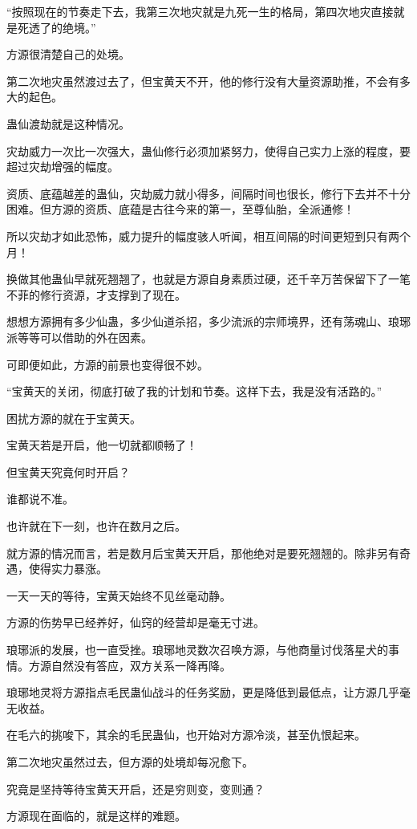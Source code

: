 \begin{this_body}
“按照现在的节奏走下去，我第三次地灾就是九死一生的格局，第四次地灾直接就是死透了的绝境。”

方源很清楚自己的处境。

第二次地灾虽然渡过去了，但宝黄天不开，他的修行没有大量资源助推，不会有多大的起色。

蛊仙渡劫就是这种情况。

灾劫威力一次比一次强大，蛊仙修行必须加紧努力，使得自己实力上涨的程度，要超过灾劫增强的幅度。

资质、底蕴越差的蛊仙，灾劫威力就小得多，间隔时间也很长，修行下去并不十分困难。但方源的资质、底蕴是古往今来的第一，至尊仙胎，全派通修！

所以灾劫才如此恐怖，威力提升的幅度骇人听闻，相互间隔的时间更短到只有两个月！

换做其他蛊仙早就死翘翘了，也就是方源自身素质过硬，还千辛万苦保留下了一笔不菲的修行资源，才支撑到了现在。

想想方源拥有多少仙蛊，多少仙道杀招，多少流派的宗师境界，还有荡魂山、琅琊派等等可以借助的外在因素。

可即便如此，方源的前景也变得很不妙。

“宝黄天的关闭，彻底打破了我的计划和节奏。这样下去，我是没有活路的。”

困扰方源的就在于宝黄天。

宝黄天若是开启，他一切就都顺畅了！

但宝黄天究竟何时开启？

谁都说不准。

也许就在下一刻，也许在数月之后。

就方源的情况而言，若是数月后宝黄天开启，那他绝对是要死翘翘的。除非另有奇遇，使得实力暴涨。

一天一天的等待，宝黄天始终不见丝毫动静。

方源的伤势早已经养好，仙窍的经营却是毫无寸进。

琅琊派的发展，也一直受挫。琅琊地灵数次召唤方源，与他商量讨伐落星犬的事情。方源自然没有答应，双方关系一降再降。

琅琊地灵将方源指点毛民蛊仙战斗的任务奖励，更是降低到最低点，让方源几乎毫无收益。

在毛六的挑唆下，其余的毛民蛊仙，也开始对方源冷淡，甚至仇恨起来。

第二次地灾虽然过去，但方源的处境却每况愈下。

究竟是坚持等待宝黄天开启，还是穷则变，变则通？

方源现在面临的，就是这样的难题。

\end{this_body}


